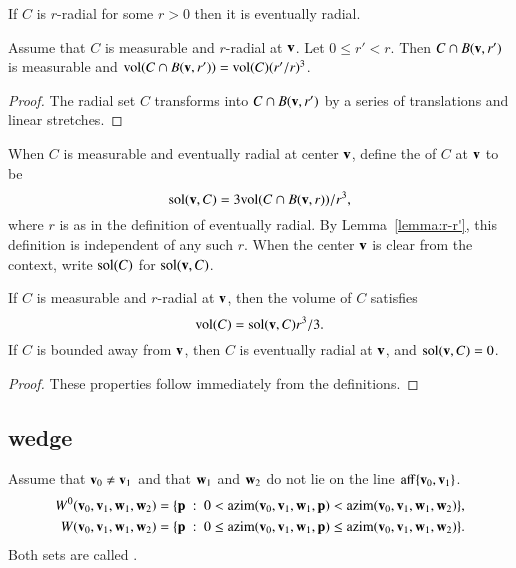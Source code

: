 \begin{lemma}
If $C$ is $r$-radial for some $r>0$ then it is eventually radial.
\end{lemma}

\begin{lemma}\label{lemma:r-r'}
Assume that $C$ is measurable and $r$-radial at ${\mathbf v}$.  Let $0\le
r'<r$.   Then $C\cap B({\mathbf v},r')$ is measurable and ${\operatorname{vol}}(C\cap
B({\mathbf v},r')) = {\operatorname{vol}}(C) (r'/r)^3$.
\end{lemma}

\begin{proof}  The radial set $C$ transforms into $C\cap B({\mathbf v},r')$ by
a series of translations and linear stretches.
\end{proof}


\begin{definition}\label{def:sol}
When $C$ is measurable and eventually radial at center ${\mathbf v}$, 
define the  of $C$ at ${\mathbf v}$ to be
\[ 
\operatorname{sol}({\mathbf v},C) = 3 {\operatorname{vol}}(C\cap B({\mathbf v},r))/r^3,
\] 
where $r$ is as in the definition of eventually radial. 
By Lemma~\ref{lemma:r-r'}, this
definition is independent of any such $r$.  When the center ${\mathbf v}$ is
clear from the context, write $\operatorname{sol}(C)$ for
$\operatorname{sol}({\mathbf v},C)$.
%
%
\end{definition}


\begin{lemma}
If $C$ is measurable and $r$-radial at ${\mathbf v}$, then the volume of $C$
satisfies
\[ 
{\operatorname{vol}}(C) = \operatorname{sol}({\mathbf v},C) r^3/3.
\] 
If $C$ is bounded away from ${\mathbf v}$, then $C$ is eventually radial at
${\mathbf v}$, and $\operatorname{sol}({\mathbf v},C) = 0$.
%
\end{lemma}

\begin{proof}
These properties follow immediately from the definitions.
\end{proof}



\subsection{wedge}
%


\begin{definition}[wedge]
Assume that ${\mathbf v}_0\ne {\mathbf v}_1$ and that
${\mathbf w}_1$ and ${\mathbf w}_2$ do not lie on
the line ${\operatorname{aff}}\{{\mathbf v}_0,{\mathbf v}_1\}$.  
\begin{align*}
W^0(\v_0,\v_1,\w_1,\w_2) &= 
\{\p %
\mid 
0< \op{azim}(\v_0,\v_1,\w_1,\p) < \op{azim}(\v_0,\v_1,\w_1,\w_2)\},\\
W(\v_0,\v_1,\w_1,\w_2) &= 
\{\p \mid 
0\le \op{azim}(\v_0,\v_1,\w_1,\p) \le \op{azim}(\v_0,\v_1,\w_1,\w_2)\}.\\
\end{align*}
Both sets are called .
\end{definition}

